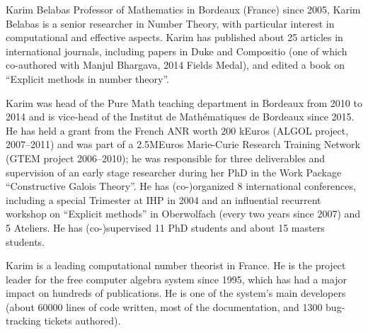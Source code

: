 \begin{participant}[type=PI,PM=12,salary=9800,gender=male]{Karim Belabas}
  Professor of Mathematics in Bordeaux (France) since 2005, Karim Belabas is
a senior researcher in Number Theory, with particular interest in
computational and effective aspects. Karim has published about 25 articles
in international journals, including papers in Duke and Compositio (one of
which co-authored with Manjul Bhargava, 2014 Fields Medal), and
edited a book on ``Explicit methods in number theory''.

Karim was head of the Pure Math teaching department in Bordeaux from 2010 to
2014 and is vice-head of the Institut de Math\'ematiques de Bordeaux since
2015. He has held a grant from the French ANR worth $200$ kEuros (ALGOL
project, 2007--2011) and was part of a 2.5MEuros Marie-Curie Research
Training Network (GTEM project 2006--2010); he was responsible for three
deliverables and supervision of an early stage researcher during her PhD in
the Work Package ``Constructive Galois Theory''. He has (co-)organized 8
international conferences, including a special Trimester at IHP in 2004 and
an influential recurrent workshop on ``Explicit methods'' in Oberwolfach
(every two years since 2007) and 5 \PariGP Ateliers. He has (co-)supervised
11 PhD students and about 15 masters students.

Karim is a leading computational number theorist in France. He
is the project leader for the \PariGP free computer algebra system since
1995, which has had a major impact on hundreds of publications. He is one of
the system's main developers (about 60000 lines of code written, most of the
documentation, and 1300 bug-tracking tickets authored).
\end{participant}

